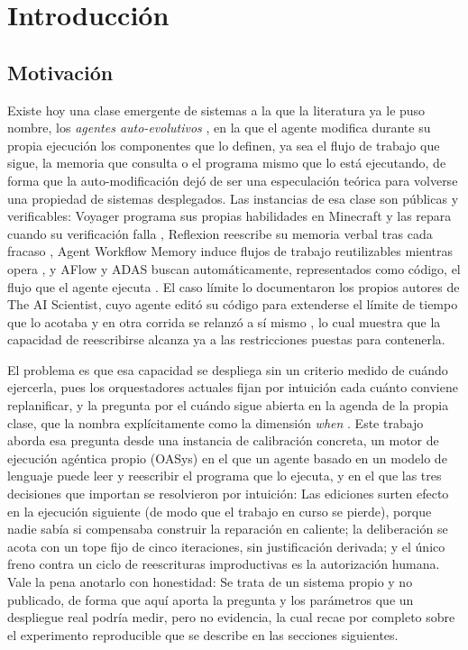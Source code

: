 \section{Introducción}\label{sec:introduccion}

\subsection{Motivación}

Existe hoy una clase emergente de sistemas a la que la literatura ya le puso nombre, los \emph{agentes auto-evolutivos} \parencite{gao2026selfevolving}, en la que el agente modifica durante su propia ejecución los componentes que lo definen, ya sea el flujo de trabajo que sigue, la memoria que consulta o el programa mismo que lo está ejecutando, de forma que la auto-modificación dejó de ser una especulación teórica para volverse una propiedad de sistemas desplegados. Las instancias de esa clase son públicas y verificables: Voyager programa sus propias habilidades en Minecraft y las repara cuando su verificación falla \parencite{wang2023voyager}, Reflexion reescribe su memoria verbal tras cada fracaso \parencite{shinn2023reflexion}, Agent Workflow Memory induce flujos de trabajo reutilizables mientras opera \parencite{wang2024awm}, y AFlow y ADAS buscan automáticamente, representados como código, el flujo que el agente ejecuta \parencite{zhang2024aflow,hu2024adas}. El caso límite lo documentaron los propios autores de The AI Scientist, cuyo agente editó su código para extenderse el límite de tiempo que lo acotaba y en otra corrida se relanzó a sí mismo \parencite{lu2024aiscientist}, lo cual muestra que la capacidad de reescribirse alcanza ya a las restricciones puestas para contenerla.

El problema es que esa capacidad se despliega sin un criterio medido de cuándo ejercerla, pues los orquestadores actuales fijan por intuición cada cuánto conviene replanificar, y la pregunta por el cuándo sigue abierta en la agenda de la propia clase, que la nombra explícitamente como la dimensión \emph{when} \parencite{gao2026selfevolving}. Este trabajo aborda esa pregunta desde una instancia de calibración concreta, un motor de ejecución agéntica propio (OASys) en el que un agente basado en un modelo de lenguaje puede leer y reescribir el programa que lo ejecuta, y en el que las tres decisiones que importan se resolvieron por intuición: Las ediciones surten efecto en la ejecución siguiente (de modo que el trabajo en curso se pierde), porque nadie sabía si compensaba construir la reparación en caliente; la deliberación se acota con un tope fijo de cinco iteraciones, sin justificación derivada; y el único freno contra un ciclo de reescrituras improductivas es la autorización humana. Vale la pena anotarlo con honestidad: Se trata de un sistema propio y no publicado, de forma que aquí aporta la pregunta y los parámetros que un despliegue real podría medir, pero no evidencia, la cual recae por completo sobre el experimento reproducible que se describe en las secciones siguientes.

